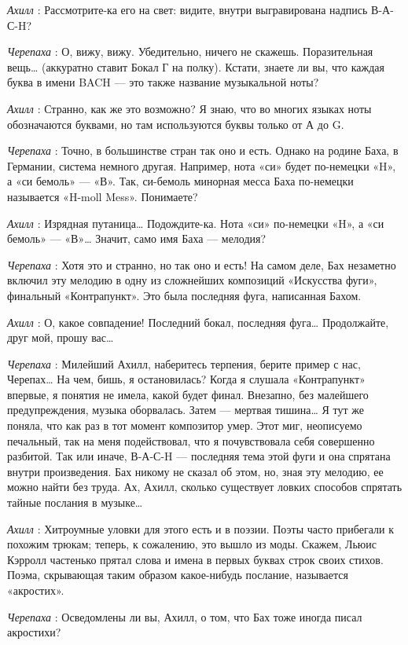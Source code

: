 \emph{Ахилл} : Рассмотрите-ка его на свет: видите, внутри выгравирована надпись В-А-С-H?

\emph{Черепаха} : О, вижу, вижу. Убедительно, ничего не скажешь. Поразительная вещь\ldots{} (аккуратно ставит Бокал Г на полку). Кстати, знаете ли вы, что каждая буква в имени BACH --- это также название музыкальной ноты?

\emph{Ахилл} : Странно, как же это возможно? Я знаю, что во многих языках ноты обозначаются буквами, но там используются буквы только от А до G.

\emph{Черепаха} : Точно, в большинстве стран так оно и есть. Однако на родине Баха, в Германии, система немного другая. Например, нота «си» будет по-немецки «H», а «си бемоль» --- «В». Так, си-бемоль минорная месса Баха по-немецки называется «H-moll Mess». Понимаете?

\emph{Ахилл} : Изрядная путаница\ldots{} Подождите-ка. Нота «си» по-немецки «H», а «си бемоль» --- «В»\ldots{} Значит, само имя Баха --- мелодия?

\emph{Черепаха} : Хотя это и странно, но так оно и есть! На самом деле, Бах незаметно включил эту мелодию в одну из сложнейших композиций «Искусства фуги», финальный «Контрапункт». Это была последняя фуга, написанная Бахом.

\emph{Ахилл} : О, какое совпадение! Последний бокал, последняя фуга\ldots{} Продолжайте, друг мой, прошу вас\ldots{}

\emph{Черепаха} : Милейший Ахилл, наберитесь терпения, берите пример с нас, Черепах\ldots{} На чем, бишь, я остановилась? Когда я слушала «Контрапункт» впервые, я понятия не имела, какой будет финал. Внезапно, без малейшего предупреждения, музыка оборвалась. Затем --- мертвая тишина\ldots{} Я тут же поняла, что как раз в тот момент композитор умер. Этот миг, неописуемо печальный, так на меня подействовал, что я почувствовала себя совершенно разбитой. Так или иначе, В-А-С-H --- последняя тема этой фуги и она спрятана внутри произведения. Бах никому не сказал об этом, но, зная эту мелодию, ее можно найти без труда. Ах, Ахилл, сколько существует ловких способов спрятать тайные послания в музыке\ldots{}

\emph{Ахилл} : Хитроумные уловки для этого есть и в поэзии. Поэты часто прибегали к похожим трюкам; теперь, к сожалению, это вышло из моды. Скажем, Льюис Кэрролл частенько прятал слова и имена в первых буквах строк своих стихов. Поэма, скрывающая таким образом какое-нибудь послание, называется «акростих».

\emph{Черепаха} : Осведомлены ли вы, Ахилл, о том, что Бах тоже иногда писал акростихи?

